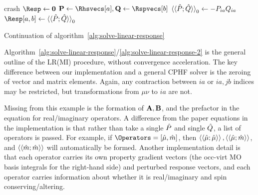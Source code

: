 \begin{algorithm}
  \begin{algorithmic}[1]
        \EndFor
        \State crash
      \EndIf
    \EndFor
  \EndFor
  \State \(\Resp \gets \mat{0}\)
      \State \(\mat{P} \gets \Rhsvecs[a], \mat{Q} \gets \Rspvecs[b]\)
      \State \(\braket{\braket{\hat{P}; \hat{Q}}}_{0} \gets -P_{ia}Q_{ia}\)
      \State \(\Resp[a,b] \gets \lr{P}{Q}_{0}\)
    \EndFor
  \EndFor
  \EndProcedure
  \end{algorithmic}
  \caption{Continuation of algorithm~\ref{alg:solve-linear-response}}
  \label{alg:solve-linear-response-2}
\end{algorithm}

Algorithm~\ref{alg:solve-linear-response}/\ref{alg:solve-linear-response-2} is the general outline of the LR(MI) procedure, without convergence acceleration. The key difference between our implementation and a general CPHF solver is the zeroing of vector and matrix elements. Again, any contraction between \(ia\) or \(ia,jb\) indices may be restricted, but transformations from \(\mu\nu\) to \(ia\) are not.

Missing from this example is the formation of \(\mathbf{A}, \mathbf{B}\), and the prefactor in the equation for real/imaginary operators. A difference from the paper equations in the implementation is that rather than take a single \(\hat{P}\) and single \(\hat{Q}\), a list of operators is passed. For example, if \(\Operators = [\op{\mu}, \op{m}]\), then \(\braket{\braket{\hat{\mu}; \hat{\mu}}},\braket{\braket{\hat{\mu}; \hat{m}}}\), and \(\braket{\braket{\hat{m}; \hat{m}}}\) will automatically be formed. Another implementation detail is that each operator carries its own property gradient vectors (the occ-virt MO basis integrals for the right-hand side) and perturbed response vectors, and each operator carries information about whether it is real/imaginary and spin conserving/altering.
